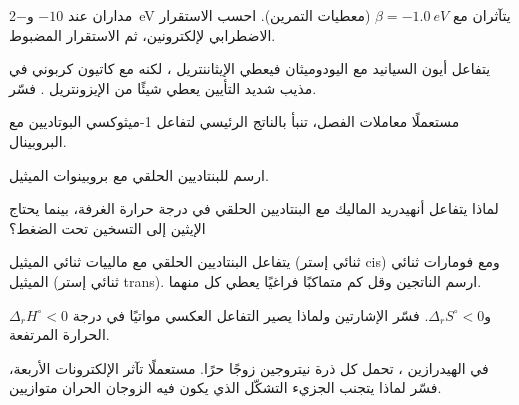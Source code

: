 \begin{exercise}[$\star\star$]\label{exo:b2:frontier-orbitals:5}
مداران عند $-10$ و\qty{-2}{eV} يتآثران مع $\beta = \qty{-1.0}{eV}$ (معطيات التمرين).
احسب الاستقرار الاضطرابي لإلكترونين، ثم الاستقرار المضبوط.
\end{exercise}

\begin{exercise}[$\star\star$]\label{exo:b2:frontier-orbitals:6}
يتفاعل أيون السيانيد مع اليودوميثان فيعطي الإيثاننتريل ، لكنه مع
كاتيون كربوني في مذيب شديد التأيين يعطي شيئًا من الإيزونتريل . فسّر.
\end{exercise}

\begin{exercise}[$\star\star$]\label{exo:b2:frontier-orbitals:7}
مستعملًا معاملات الفصل، تنبأ بالناتج الرئيسي لتفاعل 1-ميثوكسي البوتاديين
مع البروبينال.
\end{exercise}

\begin{exercise}[$\star\star$]\label{exo:b2:frontier-orbitals:8}
ارسم  للبنتاديين الحلقي مع بروبينوات الميثيل.
\end{exercise}

\begin{exercise}[$\star\star$]\label{exo:b2:frontier-orbitals:9}
لماذا يتفاعل أنهيدريد الماليك مع البنتاديين الحلقي في درجة حرارة الغرفة، بينما يحتاج الإيثين
إلى التسخين تحت الضغط؟
\end{exercise}

\begin{exercise}[$\star\star\star$]\label{exo:b2:frontier-orbitals:10}
يتفاعل البنتاديين الحلقي مع مالييات ثنائي الميثيل (ثنائي إستر cis) ومع فومارات ثنائي الميثيل
(ثنائي إستر trans). ارسم الناتجين وقل كم متماكبًا فراغيًا يعطي كل منهما.
\end{exercise}

\begin{exercise}[$\star\star\star$]\label{exo:b2:frontier-orbitals:11}
 $\Delta_r H^\circ < 0$ و$\Delta_r S^\circ < 0$. فسّر الإشارتين
ولماذا يصير التفاعل العكسي مواتيًا في درجة الحرارة المرتفعة.
\end{exercise}

\begin{exercise}[$\star\star\star$]\label{exo:b2:frontier-orbitals:12}
في الهيدرازين ، تحمل كل ذرة نيتروجين زوجًا حرًا. مستعملًا تآثر
الإلكترونات الأربعة، فسّر لماذا يتجنب الجزيء التشكّل الذي يكون فيه الزوجان
الحران متوازيين.
\end{exercise}

